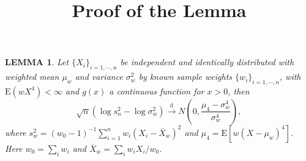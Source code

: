 \documentclass[12pt]{article}
\newtheorem{lemma}{LEMMA}
\begin{document}
\title{Proof of the Lemma}
\maketitle

\section*{}
\begin{lemma} 
    Let $\{X_i\}_{i=1,\cdots,n}$ be independent and identically distributed with weighted mean $\mu_w$ and variance $\sigma_w^2$ by known sample weights $\{ w_i \}_{i=1,\cdots,n}$, with $\mathrm{E}(wX^4) < \infty$ and $g(x)$ a continuous function for $x > 0$, then 
    \begin{equation}
        \sqrt{n}(\log s_n^2 - \log \sigma_w^2) \xrightarrow{\text{d}} N(0, \frac{\mu_4 - \sigma_w^4}{\sigma_w^4}),
    \end{equation}
    where $s_w^2=(w_0 - 1)^{-1} \sum_{i=1}^n w_i (X_i - \bar{X}_w)^2$ and $\mu_4 = \mathrm{E} [ w(X - \mu_w)^4 ]$. Here $w_0 = \sum_i w_i$ and $\bar{X}_w = \sum_i w_i X_i / w_0$.
\end{lemma}
\end{document}
